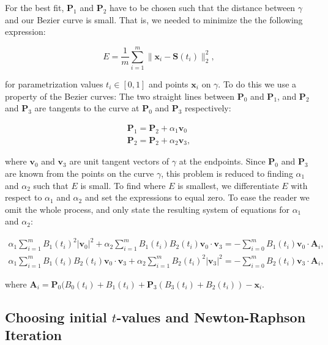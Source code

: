 \documentclass[10pt]{article}
\begin{document}
For the best fit, $\mathbf{P}_1$ and $\mathbf{P}_2$ have to be chosen such that the distance between $\gamma$ and our Bezier curve is small. That is, we needed to minimize the the following expression:

\begin{equation}
E = \frac{1}{m} \sum_{i=1}^{m} \| \mathbf{x}_i - \mathbf{S}(t_i)\|^2_2,
\end{equation}

for parametrization values $t_i \in [ 0,1 ]$ and points $\mathbf{x}_i$ on $\gamma$. To do this we use a property of the Bezier curves: The two straight lines between $\mathbf{P}_0$ and $\mathbf{P}_1$, and $\mathbf{P}_2$ and $\mathbf{P}_3$ are tangents to the curve at $\mathbf{P}_0$ and $\mathbf{P}_3$ respectively:

\begin{align}
\mathbf{P}_1 = \mathbf{P}_2 + \alpha_1 \mathbf{v}_0 \\
\mathbf{P}_2 = \mathbf{P}_2 + \alpha_2 \mathbf{v}_3,
\end{align}

where $\mathbf{v}_0$ and $\mathbf{v}_3$ are unit tangent vectors of $\gamma$ at the endpoints. Since $\mathbf{P}_0$ and $\mathbf{P}_3$ are known from the points on the curve $\gamma$, this problem is reduced to finding $\alpha_1$ and $\alpha_2$ such that $E$ is small. To find where $E$ is smallest, we differentiate $E$ with respect to $\alpha_1$ and $\alpha_2$ and set the expressions to equal zero. To ease the reader we omit the whole process, and only state the resulting system of equations for $\alpha_1$ and $\alpha_2$:


\begin{align}
\alpha_1 \sum_{i = 1}^m B_1(t_i)^2 |\mathbf{v}_0|^2 + \alpha_2 \sum_{i = 1}^m B_1(t_i)B_2(t_i)\mathbf{v}_0 \cdot \mathbf{v}_3 
= - \sum_{i = 0}^m B_1(t_i) \mathbf{v}_0 \cdot \mathbf{A}_i, \\
\alpha_1 \sum_{i = 1}^m B_1(t_i)B_2(t_i)\mathbf{v}_0 \cdot \mathbf{v}_3 + \alpha_2 \sum_{i = 1}^m B_2(t_i)^2 |\mathbf{v}_3|^2 
= - \sum_{i = 0}^m B_2(t_i)\mathbf{v}_3 \cdot \mathbf{A}_i,
\end{align}

where $\mathbf{A}_i = \mathbf{P}_0(B_0(t_i) + B_1(t_i) + \mathbf{P}_3(B_3(t_i) + B_2(t_i)) - \mathbf{x}_i$.





\subsection*{Choosing initial $t$-values and Newton-Raphson Iteration}
\end{document}
